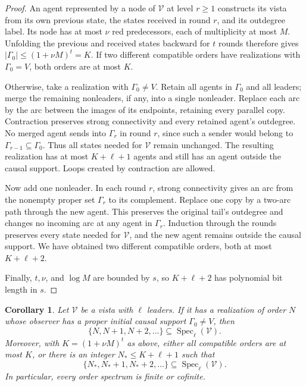 \documentclass[11pt]{article}
\newtheorem{corollary}{Corollary}
\begin{document}
\begin{proof}
An agent represented by a node of \(\mathcal V\) at level
\(r\geq1\) constructs its vista from its own previous state,
the states received in round \(r\), and its outdegree label.
Its node has at most \(\nu\) red predecessors, each of
multiplicity at most \(M\).  Unfolding the previous and received
states backward for \(t\) rounds therefore gives
\(|\Gamma_0|\leq(1+\nu M)^t=K\).
If two different compatible orders have realizations with
\(\Gamma_0=V\), both orders are at most \(K\).

Otherwise, take a realization with \(\Gamma_0\neq V\).
Retain all agents in \(\Gamma_0\) and all leaders; merge the
remaining nonleaders, if any, into a single nonleader.
Replace each arc by the arc between the images of its endpoints,
retaining every parallel copy.  Contraction preserves strong
connectivity and every retained agent's outdegree.
No merged agent sends into \(\Gamma_r\) in round \(r\),
since such a sender would belong to
\(\Gamma_{r-1}\subseteq\Gamma_0\).
Thus all states needed for \(\mathcal V\) remain unchanged.
The resulting realization has at most \(K+\ell+1\) agents
and still has an agent outside the causal support.
Loops created by contraction are allowed.

Now add one nonleader.  In each round \(r\), strong connectivity
gives an arc from the nonempty proper set \(\Gamma_r\) to its
complement.  Replace one copy by a two-arc path through the new
agent.  This preserves the original tail's outdegree and changes
no incoming arc at any agent in \(\Gamma_r\).
Induction through the rounds preserves every state needed for
\(\mathcal V\), and the new agent remains outside the causal
support.  We have obtained two different compatible orders,
both at most \(K+\ell+2\).

Finally, \(t,\nu\), and \(\log M\) are bounded by
\(s\), so \(K+\ell+2\) has polynomial bit length in \(s\).
\end{proof}

\begin{corollary}
\label{cor:conp-pumping}
Let $\mathcal V$ be a vista with $\ell$ leaders. If it has a
realization of order $N$ whose observer has a proper initial causal
support $\Gamma_0\ne V$, then
\[
  \{N,N+1,N+2,\ldots\}\subseteq
  \operatorname{Spec}_{\ell}(\mathcal V).
\]
Moreover, with $K=(1+\nu M)^t$ as above, either all compatible orders
are at most $K$, or there is an integer $N_*\le K+\ell+1$ such that
\[
  \{N_*,N_*+1,N_*+2,\ldots\}\subseteq
  \operatorname{Spec}_{\ell}(\mathcal V).
\]
In particular, every order spectrum is finite or cofinite.
\end{corollary}
\end{document}

